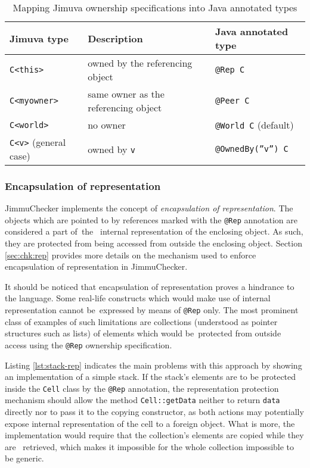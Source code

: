 \documentclass{pracamgr}
\theoremstyle{break}
\theoremstyle{break}
\theoremstyle{break}
\begin{document}
\begin{table}[htb]
  \centering
  \begin{tabular}{|l|l|l|}
    \hline
    \textbf{Jimuva type} & \textbf{Description} & \textbf{Java annotated type} \\
    \hline \hline 
    \texttt{C<this>} & owned by the referencing object & \texttt{@Rep C} \\
    \texttt{C<myowner>} & same owner as the referencing object & \texttt{@Peer C} \\
    \texttt{C<world>} & no owner & \texttt{@World C} (default) \\
    \texttt{C<v>} (general case) & owned by \texttt{v} & \texttt{@OwnedBy(''v'') C} \\
    \hline
  \end{tabular}
  \caption{Mapping Jimuva ownership specifications into Java annotated types}
  \label{tab:mapping-owner}
\end{table}

\subsubsection{Encapsulation of representation}
\label{sec:mod:encap}

JimmuChecker implements the concept of \emph{encapsulation of
  representation}. The objects which are pointed to by references
marked with the \texttt{@Rep} annotation are considered a part of~the~
internal representation of the enclosing object. As such, they are
protected from being accessed from outside the enclosing
object. Section \ref{sec:chk:rep} provides more details on the
mechanism used to enforce encapsulation of representation in
JimmuChecker. 

It should be noticed that encapsulation of representation proves a
hindrance to the language. Some real-life constructs which would make
use of internal representation cannot be~expressed by means of
\texttt{@Rep} only. The most prominent class of examples of such
li\-mi\-ta\-tions are collections (understood as pointer structures
such as lists) of elements which would be~protected from outside
access using the \texttt{@Rep} ownership specification.



Listing \ref{lst:stack-rep} indicates the main problems with this
approach by showing an implementation of a simple stack. If the
stack's elements are to be protected inside the \texttt{Cell} class by
the \texttt{@Rep} annotation, the representation protection mechanism
should allow the method \texttt{Cell::getData} neither to return
\texttt{data} directly nor to pass it to the copying constructor, as
both actions may potentially expose internal representation of the
cell to a foreign object. What is more, the implementation would
require that the collection's elements are copied while they are~
retrieved, which makes it impossible for the whole collection
impossible to be generic.
\end{document}
